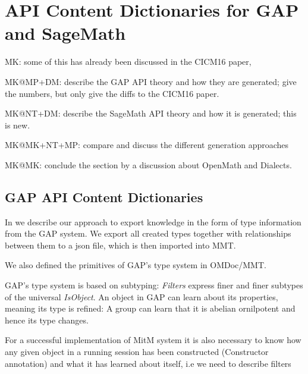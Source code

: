 \section{API Content Dictionaries for GAP and SageMath}\label{sec:ift}
\begin{todolist}{MK: some of this has already been discussed in the CICM16 paper, }
\item MK@MP+DM: describe the GAP API theory and how they are generated; give the
numbers, but only give the diffs to the CICM16 paper.

\item MK@NT+DM: describe the SageMath API theory and how it is generated; this is
  new. 
\item MK@MK+NT+MP: compare and discuss the different generation approaches
\item MK@MK: conclude the section by a discussion about OpenMath and Dialects.
\end{todolist}


\subsection{GAP API Content Dictionaries}

In \cite{DehKohKon:iop16} we describe our approach to export knowledge in the form of type information from the GAP system. 
We export all created types together with relationships between them to a json file, which is then imported into MMT.

We also defined the primitives of GAP's type system in OMDoc/MMT.

GAP's type system is based on subtyping: \emph{Filters} express finer and finer subtypes of the universal \emph{IsObject}.
An object in GAP can learn about its properties, meaning its type is refined: A group can learn that it is abelian ornilpotent and hence its type changes.

For a successful implementation of MitM system it is also necessary to know how any given object in a running session has been constructed (Constructor annotation) and what it has learned about itself, i.e we need to describe filters


